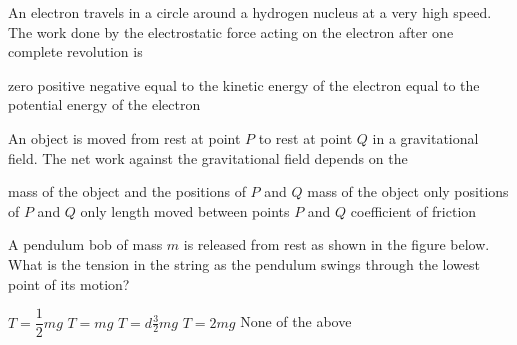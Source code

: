 \documentclass{../../../oss-classkick-exam}
\begin{document}
\begin{multicols*}{2}
\begin{questions}
    \question An electron travels in a circle around a hydrogen nucleus at a
    very high speed. The work done by the electrostatic force acting on the
    electron after one complete revolution is
    \begin{choices}
      \choice zero
      \choice positive
      \choice negative
      \choice equal to the kinetic energy of the electron
      \choice equal to the potential energy of the electron
    \end{choices}
    \vspace{.7in}
    
    \question An object is moved from rest at point $P$ to rest at point $Q$ in
    a gravitational field. The net work against the gravitational field depends
    on the
    \begin{choices}
      \choice mass of the object and the positions of $P$ and $Q$
      \choice mass of the object only
      \choice positions of $P$ and $Q$ only
      \choice length moved between points $P$ and $Q$
      \choice coefficient of friction
    \end{choices}

    \question A pendulum bob of mass $m$ is released from rest as shown in the
    figure below. What is the tension in the string as the pendulum swings
    through the lowest point of its motion?
    \begin{center}
    \end{center}
    \begin{choices}
      \choice $T=\dfrac12mg$
      \choice $T=mg$
      \choice $T=d\frac32mg$
      \choice $T=2mg$
      \choice None of the above
    \end{choices}
    \columnbreak
    


\end{questions}
\end{multicols*}
\end{document}
